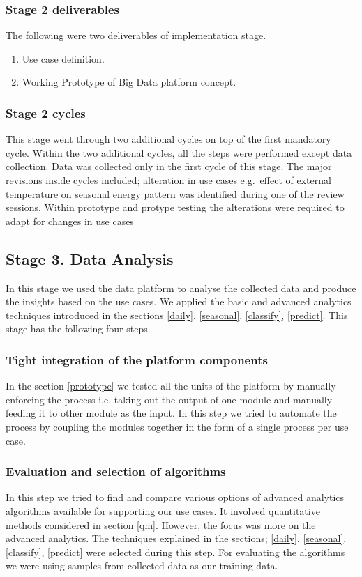 \subsubsection{Stage 2 deliverables}
The following were two deliverables of implementation stage.
\begin{enumerate}
\item Use case definition.
\item Working Prototype of Big Data platform concept.
\end{enumerate}
\subsubsection{Stage 2 cycles}
This stage went through two additional cycles on top of the first mandatory cycle. Within the two additional cycles, all the steps were performed except data collection. Data was collected only in the first cycle of this stage. 
The major revisions inside cycles included; alteration in use cases e.g.\ effect of external temperature on seasonal energy pattern was identified during one of the review sessions. Within prototype and protype testing the alterations were required to adapt for changes in use cases

\subsection{Stage 3. Data Analysis}
In this stage we used the data platform to analyse the collected data and produce the insights based on the use cases. We applied the basic and advanced analytics techniques introduced in the sections  \ref{daily}, \ref{seasonal}, \ref{classify}, \ref{predict}. This stage has the following four steps.
\subsubsection{Tight integration of the platform components}
In the section \ref{prototype} we tested all the units of the platform by manually enforcing the process i.e. taking out the  output of one module and manually feeding it to other module as the input. In this step we tried to automate the process by coupling the modules together in the form of a single process per use case. 
\subsubsection{Evaluation and selection of algorithms}\label{eval}
In this step we tried to find and compare various options of advanced analytics algorithms available for supporting our use cases. It involved quantitative methods considered in section \ref{qm}. However, the focus was more on the advanced analytics. The techniques explained in the sections; \ref{daily}, \ref{seasonal},  \ref{classify}, \ref{predict} were selected during this step. For evaluating the algorithms we were using samples from collected data as our training data. 
